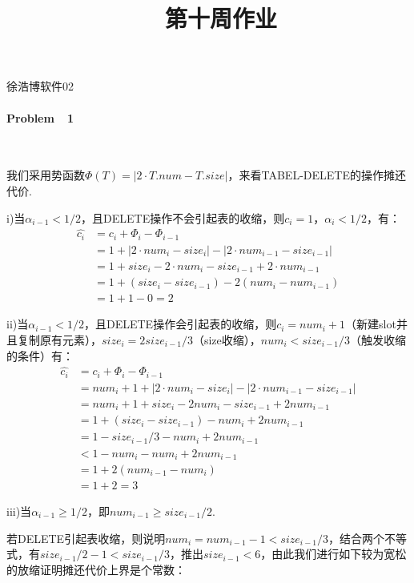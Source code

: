 \documentclass[UTF8]{ctexart}
\begin{document}
\renewcommand{\thefootnote}{\fnsymbol{footnote}}
\linespread{1.4}
\title{\vspace{-5em}\ \ 第十周作业\vspace{-2.5em}}
\date{}
\maketitle
\begin{center}
{\fangsong 徐浩博\quad 软件02}
\end{center}

\paragraph*{Problem\ \ 1}\ \par
我们采用势函数$\Phi(T)=|2\cdot T.num - T.size|$，来看TABEL-DELETE的操作摊还代价.\par
i)当$\alpha_{i-1}<1/2$，且DELETE操作不会引起表的收缩，则$c_i=1$，$\alpha_{i}<1/2$，有：
\begin{align*}
    \hat{c_i}&=c_i+\Phi_i-\Phi_{i-1}\\
    &=1+|2\cdot num_i - size_i|-|2\cdot num_{i-1} - size_{i-1}|\\
    &=1+size_i-2\cdot num_i-size_{i-1}+2\cdot num_{i-1}\\
    &=1+(size_i-size_{i-1})-2( num_i-num_{i-1})\\
    &=1+1-0=2
\end{align*}\par
ii)当$\alpha_{i-1}<1/2$，且DELETE操作会引起表的收缩，则$c_i=num_{i}+1$（新建slot并且复制原有元素），$size_{i} = 2size_{i-1}/3$（size收缩），$num_{i}< size_{i-1}/3$（触发收缩的条件）有：
\begin{align*}
    \hat{c_i}&=c_i+\Phi_i-\Phi_{i-1}\\
    &=num_{i}+1+|2\cdot num_i - size_i|-|2\cdot num_{i-1} - size_{i-1}|\\
    &=num_i+1+size_i-2num_i-size_{i-1}+2num_{i-1}\\
    &=1+(size_i-size_{i-1})-num_i+2num_{i-1}\\
    &=1-size_{i-1}/3-num_i+2num_{i-1}\\
    &<1-num_i-num_i+2num_{i-1}\\
    &=1+2(num_{i-1}-num_i)\\
    &=1+2=3
\end{align*}\par 
iii)当$\alpha_{i-1}\geq 1/2$，即$num_{i-1}\geq size_{i-1}/2$.\par 若DELETE引起表收缩，则说明$num_{i}=num_{i-1}-1< size_{i-1}/3$，结合两个不等式，有$ size_{i-1}/2 - 1<size_{i-1}/3$，推出$size_{i-1}<6$，由此我们进行如下较为宽松的放缩证明摊还代价上界是个常数：
\end{document}

